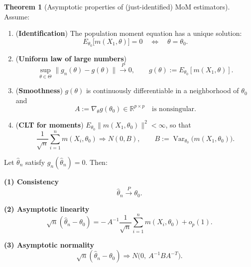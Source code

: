 \documentclass[11pt]{article}
\theoremstyle{definition}
\newtheorem{theo}{Theorem}[section]
\begin{document}
\begin{theo}[Asymptotic properties of (just-identified) MoM estimators]
Assume:

\begin{enumerate}
\item[(A1)] (\textbf{Identification}) The population moment equation has a unique solution:
\[
E_{\theta_0}\big[m(X_1,\theta)\big]=0 \quad\Longleftrightarrow\quad \theta=\theta_0.
\]
\item[(A2)] (\textbf{Uniform law of large numbers})
\[
\sup_{\theta\in\Theta}\big\|g_n(\theta)-g(\theta)\big\|\xrightarrow{P}0,
\qquad
g(\theta):=E_{\theta_0}[m(X_1,\theta)].
\]
\item[(A3)] (\textbf{Smoothness}) $g(\theta)$ is continuously differentiable in a neighborhood of $\theta_0$ and
\[
A:=\nabla_\theta g(\theta_0) \in \mathbb{R}^{p\times p}
\quad\text{is nonsingular.}
\]
\item[(A4)] (\textbf{CLT for moments}) $E_{\theta_0}\|m(X_1,\theta_0)\|^2<\infty$, so that
\[
\frac{1}{\sqrt{n}}\sum_{i=1}^n m(X_i,\theta_0)\Rightarrow N(0,B),
\qquad
B:=\operatorname{Var}_{\theta_0}\!\big(m(X_1,\theta_0)\big).
\]
\end{enumerate}

Let $\hat\theta_n$ satisfy $g_n(\hat\theta_n)=0$. Then:

\textbf{(1) Consistency}
\[
\hat\theta_n\xrightarrow{P}\theta_0.
\]

\textbf{(2) Asymptotic linearity}
\[
\sqrt{n}(\hat\theta_n-\theta_0)
=
-\,A^{-1}\frac{1}{\sqrt{n}}\sum_{i=1}^n m(X_i,\theta_0)
+o_p(1).
\]

\textbf{(3) Asymptotic normality}
\[
\sqrt{n}(\hat\theta_n-\theta_0)\Rightarrow N\!\big(0,\ A^{-1}BA^{-T}\big).
\]
\end{theo}
\end{document}
